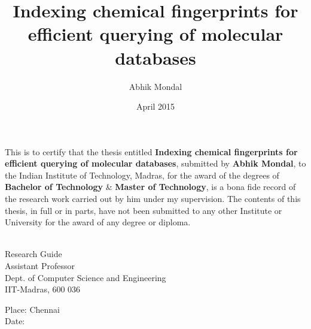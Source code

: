 \documentclass[MTech]{iitmdiss}
\def\thesistitle{Indexing chemical fingerprints for efficient querying of molecular databases}
\def\thesisauthor{Abhik Mondal}
\begin{document}


\title{\thesistitle}

\author{\thesisauthor}

\date{April 2015}

\begin{singlespace}
\maketitle 
\end{singlespace} 

\certificate

\vspace*{0.5in}

\noindent This is to certify that the thesis entitled {\bf {\thesistitle}}, 
submitted by {\bf {\thesisauthor}}, to the Indian Institute of Technology, 
Madras, for the award of the degrees of {\bf Bachelor of Technology} \& {\bf Master of Technology}, 
is a bona fide record of the research work carried out by him under my
supervision. The contents of this thesis, in full or in parts, have not been
submitted to any other Institute or University for the award of any degree or
diploma.

\vspace*{1.4in}
\hspace*{-0.25in}
\begin{singlespace}
 \\
\noindent Research Guide \\ 
\noindent Assistant Professor \\
\noindent Dept. of Computer Science and Engineering\\
\noindent IIT-Madras, 600 036 \\
\end{singlespace}
\vspace*{0.20in}
\noindent Place: Chennai\\ 
Date:

\acknowledgements




\pagebreak
\end{document}
